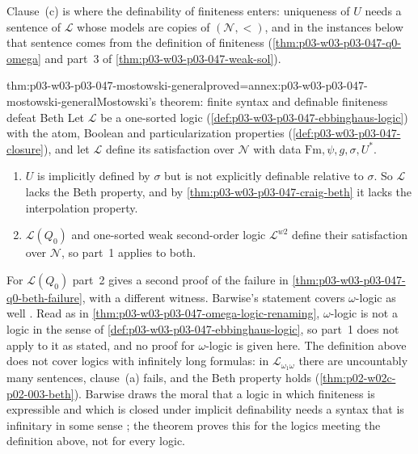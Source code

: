 Clause~(c) is where the definability of finiteness enters: uniqueness of
\(U\) needs a sentence of \(\mathscr L\) whose models are copies of
\((\mathcal N,<)\), and in the instances below that sentence comes from the
definition of finiteness (\cref{thm:p03-w03-p03-047-q0-omega} and part~3 of
\cref{thm:p03-w03-p03-047-weak-sol}).

\begin{hbtheorem}{thm:p03-w03-p03-047-mostowski-general}{proved=annex:p03-w03-p03-047-mostowski-general}{Mostowski's theorem: finite syntax and definable finiteness defeat Beth}
Let \(\mathscr L\) be a one-sorted logic
(\cref{def:p03-w03-p03-047-ebbinghaus-logic}) with the atom, Boolean and
particularization properties (\cref{def:p03-w03-p03-047-closure}), and let
\(\mathscr L\) define its satisfaction over \(\mathcal N\) with data
\(\mathrm{Fm},\psi,g,\sigma,U^\ast\).
\begin{enumerate}
 \item \(U\) is implicitly defined by \(\sigma\) but is not explicitly
       definable relative to \(\sigma\).  So \(\mathscr L\) lacks the Beth
       property, and by \cref{thm:p03-w03-p03-047-craig-beth} it lacks the
       interpolation property.
 \item \(\mathscr L(Q_0)\) and one-sorted weak second-order logic
       \(\mathscr L^{w2}\) define their satisfaction over \(\mathcal N\), so
       part~1 applies to both.
\end{enumerate}
\end{hbtheorem}

For \(\mathscr L(Q_0)\) part~2 gives a second proof of the failure in
\cref{thm:p03-w03-p03-047-q0-beth-failure}, with a different witness.
Barwise's statement covers \(\omega\)-logic as well
\cite[Ch.~I, \S1.6, p.~10]{Barwise1985BackgroundAims}.  Read as in
\cref{thm:p03-w03-p03-047-omega-logic-renaming}, \(\omega\)-logic is not a
logic in the sense of \cref{def:p03-w03-p03-047-ebbinghaus-logic}, so
part~1 does not apply to it as stated, and no proof for \(\omega\)-logic is
given here.  The definition above does not cover logics with infinitely long
formulas: in \(\mathscr L_{\omega_1\omega}\) there are uncountably many
sentences, clause~(a) fails, and the Beth property holds
(\cref{thm:p02-w02c-p02-003-beth}).  Barwise draws the moral that a logic
in which finiteness is expressible and which is closed under implicit
definability needs a syntax that is infinitary in some sense
\cite[Ch.~I, \S1.6, p.~10]{Barwise1985BackgroundAims}; the theorem proves
this for the logics meeting the definition above, not for every logic.

